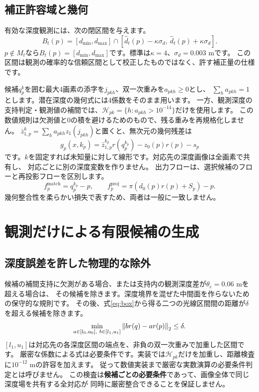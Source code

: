 \documentclass[a4paper,11pt]{ltjsarticle}
\theoremstyle{definition}
\begin{document}
\subsection{補正許容域と幾何}
有効な深度観測には、次の閉区間を与えます。
\begin{equation}\label{eq:box}
B_t(p)=[d_{\min},d_{\max}]\cap
[\widehat d_t(p)-\kappa\sigma_d,\ \widehat d_t(p)+\kappa\sigma_d].
\end{equation}
$p\notin M_t$なら$B_t(p)=[d_{\min},d_{\max}]$です。標準は$\kappa=4$、$\sigma_d=0.003$ mです。
この区間は観測の確率的な信頼区間として校正したものではなく、許す補正量の仕様です。

候補$q_p^k$を囲む最大4画素の添字を$j_{pkh}$、双一次重みを$a_{pkh}\ge0$とし、
$\sum_h a_{pkh}=1$とします。潜在深度の幾何式には4係数をそのまま用います。
一方、観測深度の支持判定・観測値の補間では、$\mathcal H_{pk}=\{h:a_{pkh}>10^{-14}\}$だけを使用します。
この数値規則は欠測値と0の積を避けるためのもので、残る重みを再規格化しません。
$\bar z_{1,p}^{k}=\sum_h a_{pkh}z_1(j_{pkh})$と置くと、無次元の幾何残差は
\begin{equation}\label{eq:geometry}
g_p(x,k_p)=\bar z_{1,p}^{k_p}r(q_p^{k_p})-z_0(p)r(p)-s_p
\end{equation}
です。$k$を固定すれば未知量に対して線形です。対応先の深度画像は全画素で共有し、
対応ごとに別の深度変数を作りません。
出力フローは、選択候補のフローと再投影フローを区別します。
\begin{equation}\label{eq:flows}
f_p^{\mathrm{match}}=q_p^{k_p}-p,\qquad
f_p^{\mathrm{proj}}=\pi(d_0(p)r(p)+S_p)-p.
\end{equation}
幾何整合性を柔らかい損失で表すため、両者は一般に一致しません。

\section{観測だけによる有限候補の生成}
\subsection{深度誤差を許した物理的な除外}
候補の補間支持に欠測がある場合、または支持内の観測深度差が$\theta_e=0.06$ mを超える場合は、
その候補を除きます。深度境界を混ぜた中間面を作らないための保守的な規則です。
その後、式\eqref{eq:box}から得る二つの光線区間間の距離が$\delta$を超える候補を除きます。
\begin{equation}\label{eq:gate}
\min_{a\in[l_0,u_0],\ b\in[l_1,u_1]}
\left\lVert b r(q)-a r(p)\right\rVert_2\le\delta.
\end{equation}
$[l_1,u_1]$は対応先の各深度区間の端点を、非負の双一次重みで加重した区間です。
厳密な係数による式は必要条件です。実装では$\mathcal H_{pk}$だけを加重し、距離検査に$10^{-12}$ mの許容を加えます。
従って数値実装まで厳密な実数演算の必要条件判定とは呼びません。
この検査は\textbf{候補ごとの必要条件}であって、画像全体で同じ深度場を共有する全対応が
同時に厳密整合できることを保証しません。
\end{document}
